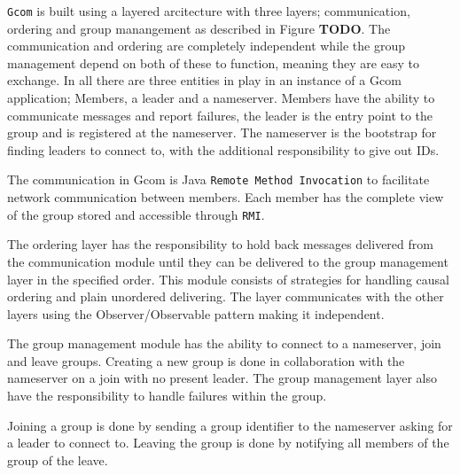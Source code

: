 	\texttt{Gcom} is built using a layered arcitecture with three layers; communication, ordering and group manangement as described in Figure \textbf{TODO}.
	The communication and ordering are completely independent while the group management depend on both of these to function, meaning they are easy to exchange.
	In all there are three entities in play in an instance of a Gcom application; Members, a leader and a nameserver.
	Members have the ability to communicate messages and report failures, the leader is the entry point to the group and is registered at the nameserver.
	The nameserver is the bootstrap for finding leaders to connect to, with the additional responsibility to give out IDs.

	The communication in Gcom is Java \texttt{Remote Method Invocation} to facilitate network communication between members.
	Each member has the complete view of the group stored and accessible through \texttt{RMI}.








	

	The ordering layer has the responsibility to hold back messages delivered from the communication module until they can be delivered to the group management layer in the specified order.
	This module consists of strategies for handling causal ordering and plain unordered delivering.
	The layer communicates with the other layers using the Observer/Observable pattern making it independent.



	The group management module has the ability to connect to a nameserver, join and leave groups.
	Creating a new group is done in collaboration with the nameserver on a join with no present leader.
	The group management layer also have the responsibility to handle failures within the group.


	Joining a group is done by sending a group identifier to the nameserver asking for a leader to connect to.
	Leaving the group is done by notifying all members of the group of the leave.


